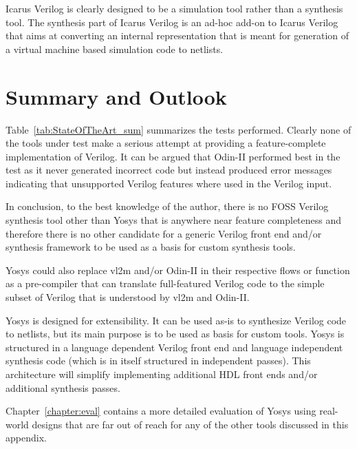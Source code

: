 Icarus Verilog is clearly designed to be a simulation tool rather than a
synthesis tool. The synthesis part of Icarus Verilog is an ad-hoc add-on to
Icarus Verilog that aims at converting an internal representation that is meant
for generation of a virtual machine based simulation code to netlists.

\section{Summary and Outlook}

Table~\ref{tab:StateOfTheArt_sum} summarizes the tests performed. Clearly none
of the tools under test make a serious attempt at providing a feature-complete
implementation of Verilog. It can be argued that Odin-II performed best in the
test as it never generated incorrect code but instead produced error messages
indicating that unsupported Verilog features where used in the Verilog input.

In conclusion, to the best knowledge of the author, there is no FOSS Verilog
synthesis tool other than Yosys that is anywhere near feature completeness and
therefore there is no other candidate for a generic Verilog front end and/or
synthesis framework to be used as a basis for custom synthesis tools.

Yosys could also replace vl2m and/or Odin-II in their respective flows or
function as a pre-compiler that can translate full-featured Verilog code to the
simple subset of Verilog that is understood by vl2m and Odin-II.

Yosys is designed for extensibility. It can be used as-is to synthesize Verilog
code to netlists, but its main purpose is to be used as basis for custom tools.
Yosys is structured in a language dependent Verilog front end and language
independent synthesis code (which is in itself structured in independent
passes). This architecture will simplify implementing additional HDL front
ends and/or additional synthesis passes.

Chapter~\ref{chapter:eval} contains a more detailed evaluation of Yosys using real-world
designs that are far out of reach for any of the other tools discussed in this appendix.

